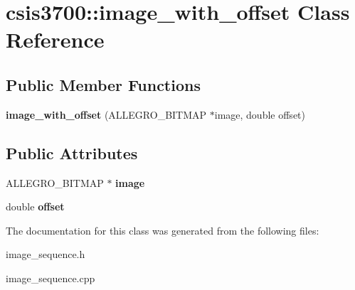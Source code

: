 \hypertarget{classcsis3700_1_1image__with__offset}{}\section{csis3700\+:\+:image\+\_\+with\+\_\+offset Class Reference}
\label{classcsis3700_1_1image__with__offset}
\subsection*{Public Member Functions}
\begin{DoxyCompactItemize}
\item 
\mbox{\label{classcsis3700_1_1image__with__offset_ad9d01a0d16d8f36981054d6f16967d1f}} 
{\bfseries image\+\_\+with\+\_\+offset} (A\+L\+L\+E\+G\+R\+O\+\_\+\+B\+I\+T\+M\+AP $\ast$image, double offset)
\end{DoxyCompactItemize}
\subsection*{Public Attributes}
\begin{DoxyCompactItemize}
\item 
\mbox{\label{classcsis3700_1_1image__with__offset_a9440b6eb66dfad9a7bf83b5dfe8baf86}} 
A\+L\+L\+E\+G\+R\+O\+\_\+\+B\+I\+T\+M\+AP $\ast$ {\bfseries image}
\item 
\mbox{\label{classcsis3700_1_1image__with__offset_a15708b2a95ca7a765baccb19df7bd0c6}} 
double {\bfseries offset}
\end{DoxyCompactItemize}


The documentation for this class was generated from the following files\+:\begin{DoxyCompactItemize}
\item 
image\+\_\+sequence.\+h\item 
image\+\_\+sequence.\+cpp\end{DoxyCompactItemize}
